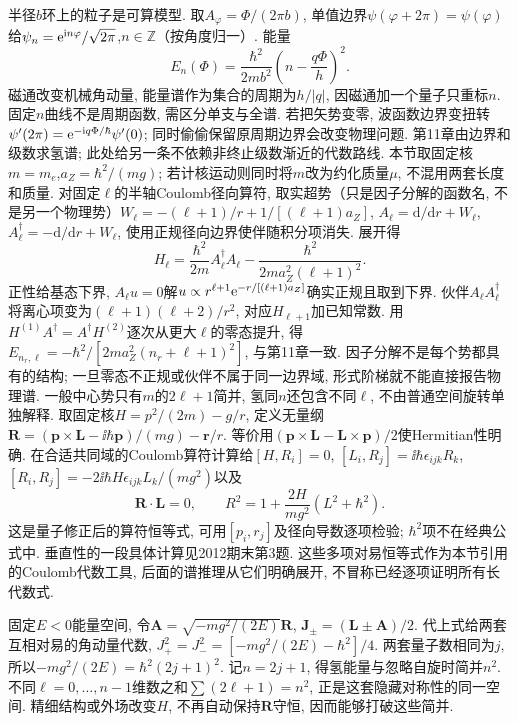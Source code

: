 半径$b$环上的粒子是可算模型. 取$A_\varphi=\Phi/(2\pi b)$, 单值边界$\psi(\varphi+2\pi)=\psi(\varphi)$给$\psi_n=\mathrm e^{\mathrm i n\varphi}/\sqrt{2\pi}$,$n\in\mathbb Z$（按角度归一）. 能量
\[
E_n(\Phi)=\frac{\hbar^2}{2mb^2}\left(n-\frac{q\Phi}{h}\right)^2.
\]
磁通改变机械角动量, 能量谱作为集合的周期为$h/|q|$, 因磁通加一个量子只重标$n$. 固定$n$曲线不是周期函数, 需区分单支与全谱. 若把矢势变零, 波函数边界变扭转$\psi'(2\pi)=\mathrm e^{-\mathrm i q\Phi/\hbar}\psi'(0)$; 同时偷偷保留原周期边界会改变物理问题.
第11章由边界和级数求氢谱; 此处给另一条不依赖非终止级数渐近的代数路线. 本节取固定核$m=m_e$,$a_Z=\hbar^2/(mg)$; 若计核运动则同时将$m$改为约化质量$\mu$, 不混用两套长度和质量. 对固定$\ell$的半轴Coulomb径向算符, 取实超势（只是因子分解的函数名, 不是另一个物理势）$W_\ell=-(\ell+1)/r+1/[(\ell+1)a_Z]$, $A_\ell=\mathrm d/\mathrm dr+W_\ell$, $A_\ell^\dagger=-\mathrm d/\mathrm dr+W_\ell$, 使用正规径向边界使伴随积分项消失. 展开得
\[
H_\ell=\frac{\hbar^2}{2m}A_\ell^\dagger A_\ell-\frac{\hbar^2}{2ma_Z^2(\ell+1)^2}.
\]
正性给基态下界, $A_\ell u=0$解$u\propto r^{\ell+1}\mathrm e^{-r/[(\ell+1)a_Z]}$确实正规且取到下界. 伙伴$A_\ell A_\ell^\dagger$将离心项变为$(\ell+1)(\ell+2)/r^2$, 对应$H_{\ell+1}$加已知常数. 用$H^{(1)}A^\dagger=A^\dagger H^{(2)}$逐次从更大$\ell$的零态提升, 得$E_{n_r,\ell}=-\hbar^2/[2ma_Z^2(n_r+\ell+1)^2]$, 与第11章一致. 因子分解不是每个势都具有的结构; 一旦零态不正规或伙伴不属于同一边界域, 形式阶梯就不能直接报告物理谱.
一般中心势只有$m$的$2\ell+1$简并, 氢同$n$还包含不同$\ell$, 不由普通空间旋转单独解释. 取固定核$H=p^2/(2m)-g/r$, 定义无量纲$\boldsymbol R=(\boldsymbol p\times\boldsymbol L-\ii\hbar\boldsymbol p)/(mg)-\boldsymbol r/r$. 等价用$(\boldsymbol p\times\boldsymbol L-\boldsymbol L\times\boldsymbol p)/2$使Hermitian性明确. 在合适共同域的Coulomb算符计算给$[H,R_i]=0$, $[L_i,R_j]=\ii\hbar\epsilon_{ijk}R_k$, $[R_i,R_j]=-2\ii\hbar H\epsilon_{ijk}L_k/(mg^2)$以及
\[
\boldsymbol R\cdot\boldsymbol L=0,\qquad R^2=1+\frac{2H}{mg^2}(L^2+\hbar^2).
\]
这是量子修正后的算符恒等式, 可用$[p_i,r_j]$及径向导数逐项检验; $\hbar^2$项不在经典公式中. 垂直性的一段具体计算见2012期末第3题. 这些多项对易恒等式作为本节引用的Coulomb代数工具, 后面的谱推理从它们明确展开, 不冒称已经逐项证明所有长代数式.

固定$E<0$能量空间, 令$\boldsymbol A=\sqrt{-mg^2/(2E)}\boldsymbol R$, $\boldsymbol J_\pm=(\boldsymbol L\pm\boldsymbol A)/2$. 代上式给两套互相对易的角动量代数, $J_+^2=J_-^2=[-mg^2/(2E)-\hbar^2]/4$. 两套量子数相同为$j$, 所以$-mg^2/(2E)=\hbar^2(2j+1)^2$. 记$n=2j+1$, 得氢能量与忽略自旋时简并$n^2$. 不同$\ell=0,\ldots,n-1$维数之和$\sum(2\ell+1)=n^2$, 正是这套隐藏对称性的同一空间. 精细结构或外场改变$H$, 不再自动保持$\boldsymbol R$守恒, 因而能够打破这些简并.
